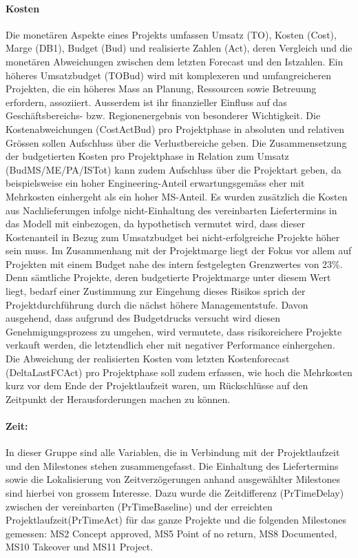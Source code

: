 \paragraph{Kosten} Die monetären Aspekte eines Projekts umfassen Umsatz (TO), Kosten (Cost), Marge (DB1), Budget (Bud) und realisierte Zahlen (Act), deren Vergleich und die monetären Abweichungen zwischen dem letzten Forecast und den Istzahlen. Ein höheres Umsatzbudget (TOBud) wird mit komplexeren und umfangreicheren Projekten, die ein höheres Mass an Planung, Ressourcen sowie Betreuung erfordern, assoziiert. Ausserdem ist ihr finanzieller Einfluss auf das Geschäftsbereichs- bzw. Regionenergebnis von besonderer Wichtigkeit. Die Kostenabweichungen (CostActBud) pro Projektphase in absoluten und relativen Grössen sollen Aufschluss über die Verlustbereiche geben. Die Zusammensetzung der budgetierten Kosten pro Projektphase in Relation zum Umsatz (BudMS/ME/PA/ISTot) kann zudem Aufschluss über die Projektart geben, da beispielsweise ein hoher Engineering-Anteil erwartungsgemäss eher mit Mehrkosten einhergeht als ein hoher MS-Anteil. Es wurden zusätzlich die Kosten aus Nachlieferungen infolge nicht-Einhaltung des vereinbarten Liefertermins in das Modell mit einbezogen, da hypothetisch vermutet wird, dass dieser Kostenanteil in Bezug zum Umsatzbudget bei nicht-erfolgreiche Projekte höher sein muss. Im Zusammenhang mit der Projektmarge liegt der Fokus vor allem auf Projekten mit einem Budget nahe des intern festgelegten Grenzwertes von 23\%. Denn sämtliche Projekte, deren budgetierte Projektmarge unter diesem Wert liegt, bedarf einer Zustimmung zur Eingehung dieses Risikos sprich der Projektdurchführung durch die nächst höhere Managementstufe. Davon ausgehend, dass aufgrund des Budgetdrucks versucht wird diesen Genehmigungsprozess zu umgehen, wird vermutete, dass risikoreichere Projekte verkauft werden, die letztendlich eher mit negativer Performance einhergehen. Die Abweichung der realisierten Kosten vom letzten Kostenforecast (DeltaLastFCAct) pro Projektphase soll zudem erfassen, wie hoch die Mehrkosten kurz vor dem Ende der Projektlaufzeit waren, um Rückschlüsse auf den Zeitpunkt der Herausforderungen machen zu können. %
\paragraph{Zeit: } In dieser Gruppe sind alle Variablen, die in Verbindung mit der Projektlaufzeit und den Milestones stehen zusammengefasst. Die Einhaltung des Liefertermins sowie die Lokalisierung von Zeitverzögerungen anhand ausgewählter Milestones sind hierbei von grossem Interesse. Dazu wurde die Zeitdifferenz (PrTimeDelay) zwischen der vereinbarten (PrTimeBaseline) und der erreichten Projektlaufzeit(PrTimeAct) für das ganze Projekte und die folgenden Milestones gemessen: MS2 Concept approved, MS5 Point of no return, MS8 Documented, MS10 Takeover und MS11 Project.
